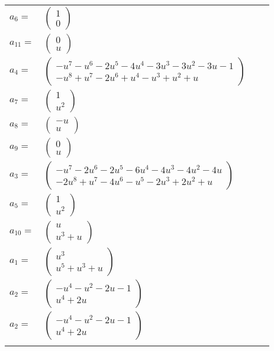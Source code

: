 \documentclass[1p]{elsarticle_modified}
\theoremstyle{definition}
\begin{document}
\begin{tabular}{m{7pt} m{180pt} m{7pt} m{180pt} }
\flushright $a_{6}=$&$\begin{pmatrix}1\\0\end{pmatrix}$ \\
\flushright $a_{11}=$&$\begin{pmatrix}0\\u\end{pmatrix}$ \\
\flushright $a_{4}=$&$\begin{pmatrix}- u^7- u^6-2 u^5-4 u^4-3 u^3-3 u^2-3 u-1\\- u^8+u^7-2 u^6+u^4- u^3+u^2+u\end{pmatrix}$ \\
\flushright $a_{7}=$&$\begin{pmatrix}1\\u^2\end{pmatrix}$ \\
\flushright $a_{8}=$&$\begin{pmatrix}- u\\u\end{pmatrix}$ \\
\flushright $a_{9}=$&$\begin{pmatrix}0\\u\end{pmatrix}$ \\
\flushright $a_{3}=$&$\begin{pmatrix}- u^7-2 u^6-2 u^5-6 u^4-4 u^3-4 u^2-4 u\\-2 u^8+u^7-4 u^6- u^5-2 u^3+2 u^2+u\end{pmatrix}$ \\
\flushright $a_{5}=$&$\begin{pmatrix}1\\u^2\end{pmatrix}$ \\
\flushright $a_{10}=$&$\begin{pmatrix}u\\u^3+u\end{pmatrix}$ \\
\flushright $a_{1}=$&$\begin{pmatrix}u^3\\u^5+u^3+u\end{pmatrix}$ \\
\flushright $a_{2}=$&$\begin{pmatrix}- u^4- u^2-2 u-1\\u^4+2 u\end{pmatrix}$\\ \flushright $a_{2}=$&$\begin{pmatrix}- u^4- u^2-2 u-1\\u^4+2 u\end{pmatrix}$\\&\end{tabular}
\end{document}
